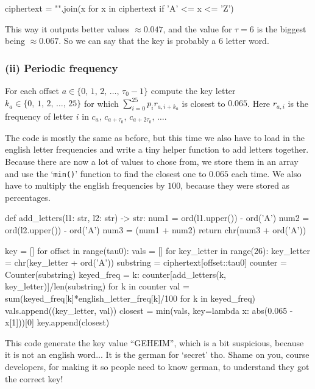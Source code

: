 \documentclass{article}
\begin{document}
  \begin{mylisting}
    ciphertext = "".join(x for x in ciphertext if 'A' <= x <= 'Z')
  \end{mylisting}
  This way it outputs better values $\approx 0.047$, and the value for $\tau=6$ is the biggest being $\approx 0.067$.
  So we can say that the key is probably a $6$ letter word.

  \subsubsection*{(ii) Periodic frequency}
  \begin{centerframebox}
    For each offset $a \in \{0,\, 1,\, 2,\, \dots,\, \tau_0 - 1\}$ compute the key letter $k_a \in \{0,\, 1,\, 2,\, \dots,\, 25\}$
    for which $\sum_{i=0}^{25} p_i r_{a,i+k_a}$ is closest to $0.065$.
    Here $r_{a,i}$ is the frequency of letter $i$ in $c_a,\, c_{a+\tau_0},\, c_{a+2\tau_0},\, \dots$.
  \end{centerframebox}
  The code is mostly the same as before, but this time we also have to load in the english letter frequencies
  and write a tiny helper function to add letters together.
  Because there are now a lot of values to chose from,
  we store them in an array and use the `\texttt{min()}' function to find the closest one to $0.065$ each time.
  We also have to multiply the english frequencies by $100$, because they were stored as percentages.

  \begin{mylisting}
    def add_letters(l1: str, l2: str) -> str:
      num1 = ord(l1.upper()) - ord('A')
      num2 = ord(l2.upper()) - ord('A')
      num3 = (num1 + num2) %
      return chr(num3 + ord('A'))

    key = []
    for offset in range(tau0):
      vals = []
      for key_letter in range(26):
        key_letter = chr(key_letter + ord('A'))
        substring = ciphertext[offset::tau0]
        counter = Counter(substring)
        keyed_freq = {k: counter[add_letters(k, key_letter)]/len(substring) for k in counter}
        val = sum(keyed_freq[k]*english_letter_freq[k]/100 for k in keyed_freq)
        vals.append((key_letter, val))
      closest = min(vals, key=lambda x: abs(0.065 - x[1]))[0]
      key.append(closest)
  \end{mylisting}

  This code generate the key value ``GEHEIM'', which is a bit suspicious, because it is not an english word...
  It is the german for `secret' tho.
  Shame on you, course developers, for making it so people need to know german, to understand they got the correct key!
\end{document}
